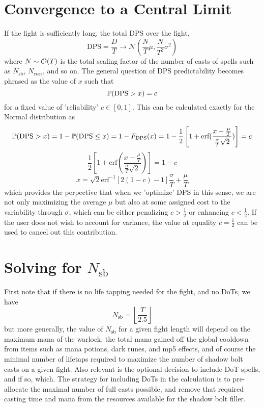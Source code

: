 \section*{Convergence to a Central Limit}
%
If the fight is sufficiently long, the total DPS over the fight,
%
$$
\text{DPS} = \frac{D}{T}
\rightarrow \mathcal{N}(\frac{N}{T} \mu, \frac{N}{T^2} \sigma^2)
$$
%
where $N \sim \bigO(T)$ is the total scaling factor of the number of casts of spells such as $N_\text{sb}$, $N_\text{corr}$, and so on. The general question of DPS predictability becomes phrased as the value of $x$ such that
%
$$
\P(\text{DPS} > x) = c
$$
%
for a fixed value of 'reliability' $c \in [0,1]$. This can be calculated exactly for the Normal distribution as
%
$$
\P(\text{DPS} > x) = 1 - \P(\text{DPS} \leq x)
= 1 - F_\text{DPS}(x)
= 1 - \frac{1}{2} \left[ 1 + \text{erf}(\frac{ x - \frac{\mu}{T} }{ \frac{\sigma}{T} \sqrt{2} }) \right] = c
$$
%
$$
\frac{1}{2} \left[ 1 + \text{erf}(\frac{ x - \frac{\mu}{T} }{ \frac{\sigma}{T} \sqrt{2} }) \right] = 1 - c
$$
$$
x = \sqrt{2} \text{erf}^{-1} \left[ 2 (1 - c) - 1 \right] \frac{\sigma}{T} + \frac{\mu}{T}
$$
%
which provides the perpective that when we 'optimize' DPS in this sense, we are not only maximizing the average $\mu$ but also at some assigned cost to the variability through $\sigma$, which can be either penalizing $c > \frac{1}{2}$ or enhancing $c < \frac{1}{2}$. If the user does not wish to account for variance, the value at equality $c = \frac{1}{2}$ can be used to cancel out this contribution.



\section*{Solving for $N_\text{sb}$}
%
First note that if there is no life tapping needed for the fight, and no DoTs, we have
%
$$
N_\text{sb} = \left\lfloor \frac{T}{2.5} \right\rfloor
$$
%
but more generally, the value of $N_\text{sb}$ for a given fight length will depend on the maximum mana of the warlock, the total mana gained off the global cooldown from items such as mana potions, dark runes, and mp5 effects, and of course the minimal number of lifetaps required to maximize the number of shadow bolt casts on a given fight. Also relevant is the optional decision to include DoT spells, and if so, which. The strategy for including DoTs in the calculation is to pre-allocate the maximal number of full casts possible, and remove that required casting time and mana from the resources available for the shadow bolt filler.


